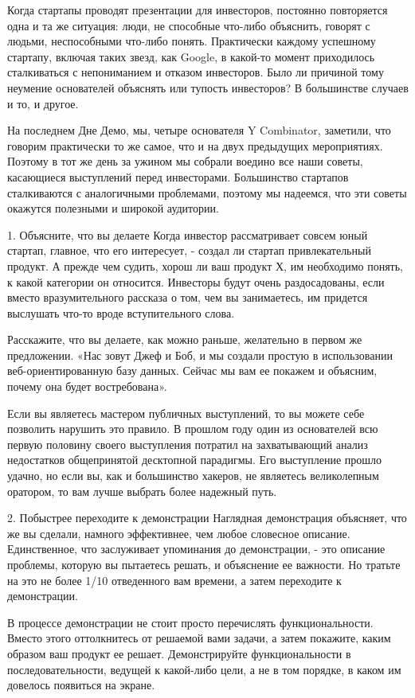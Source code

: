 \documentclass[ebook,12pt,oneside,openany]{memoir}
\begin{document}
Когда стартапы проводят презентации для инвесторов, постоянно
повторяется одна и та же ситуация: люди, не способные что-либо
объяснить, говорят с людьми, неспособными что-либо понять. Практически
каждому успешному стартапу, включая таких звезд, как Google, в
какой-то момент приходилось сталкиваться с непониманием и отказом
инвесторов. Было ли причиной тому неумение основателей объяснять или
тупость инвесторов? В большинстве случаев и то, и другое.

На последнем Дне Демо, мы, четыре основателя Y Combinator, заметили,
что говорим практически то же самое, что и на двух предыдущих
мероприятиях. Поэтому в тот же день за ужином мы собрали воедино все
наши советы, касающиеся выступлений перед инвесторами. Большинство
стартапов сталкиваются с аналогичными проблемами, поэтому мы надеемся,
что эти советы окажутся полезными и широкой аудитории.

1. Объясните, что вы делаете Когда инвестор рассматривает совсем юный
стартап, главное, что его интересует, - создал ли стартап
привлекательный продукт. А прежде чем судить, хорош ли ваш продукт Х,
им необходимо понять, к какой категории он относится. Инвесторы будут
очень раздосадованы, если вместо вразумительного рассказа о том, чем
вы занимаетесь, им придется выслушать что-то вроде вступительного
слова.

Расскажите, что вы делаете, как можно раньше, желательно в первом же
предложении. «Нас зовут Джеф и Боб, и мы создали простую в
использовании веб-ориентированную базу данных. Сейчас мы вам ее
покажем и объясним, почему она будет востребована».

Если вы являетесь мастером публичных выступлений, то вы можете себе
позволить нарушить это правило. В прошлом году один из основателей всю
первую половину своего выступления потратил на захватывающий анализ
недостатков общепринятой десктопной парадигмы. Его выступление прошло
удачно, но если вы, как и большинство хакеров, не являетесь
великолепным оратором, то вам лучше выбрать более надежный путь.

2. Побыстрее переходите к демонстрации Наглядная демонстрация
объясняет, что же вы сделали, намного эффективнее, чем любое словесное
описание. Единственное, что заслуживает упоминания до демонстрации, -
это описание проблемы, которую вы пытаетесь решать, и объяснение ее
важности. Но тратьте на это не более 1/10 отведенного вам времени, а
затем переходите к демонстрации.

В процессе демонстрации не стоит просто перечислять функциональности.
Вместо этого оттолкнитесь от решаемой вами задачи, а затем покажите,
каким образом ваш продукт ее решает. Демонстрируйте функциональности в
последовательности, ведущей к какой-либо цели, а не в том порядке, в
каком им довелось появиться на экране.
\end{document}
